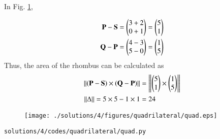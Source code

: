 In Fig. \ref{fig:2.2.4_quadrilateral},

\begin{align}
\mathbf P - \mathbf S &= \begin{pmatrix}3 +2\\0+1\end{pmatrix}
= \begin{pmatrix}5\\1\end{pmatrix}
\\
\mathbf Q - \mathbf P &= \begin{pmatrix}4-3\\5-0\end{pmatrix}
= \begin{pmatrix}1\\5\end{pmatrix}
\end{align}
Thus, the area of the rhombus can be calculated as 
\begin{align}
\left\lVert \mathbf{\left(\mathbf P - \mathbf S\right)} \times \mathbf{\left(\mathbf Q - \mathbf P\right)}\right\rVert
&= \left\lVert \mathbf{\begin{pmatrix}5\\1\end{pmatrix}} \times \mathbf{\begin{pmatrix}1\\5\end{pmatrix}}\right\rVert
	\\
	\left\lVert\Delta\right\rVert = 5 \times 5 - 1 \times 1&= 24
\end{align}
\begin{figure}[!ht]
	\centering
	\texttt{[image: ./solutions/4/figures/quadrilateral/quad.eps]}
	\caption{}
	\label{fig:2.2.4_quadrilateral}
\end{figure}
\begin{lstlisting}
solutions/4/codes/quadrilateral/quad.py
\end{lstlisting}


